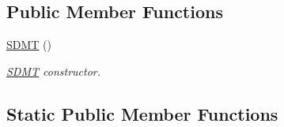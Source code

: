 \subsection*{Public Member Functions}
\begin{DoxyCompactItemize}
\item 
\mbox{\label{class_s_d_m_t_a93fb108be06183e27b33ca23919c0ff9}} 
\hyperlink{class_s_d_m_t_a93fb108be06183e27b33ca23919c0ff9}{S\+D\+MT} ()
\begin{DoxyCompactList}\small\item\em \hyperlink{class_s_d_m_t}{S\+D\+MT} constructor. \end{DoxyCompactList}\end{DoxyCompactItemize}
\subsection*{Static Public Member Functions}
